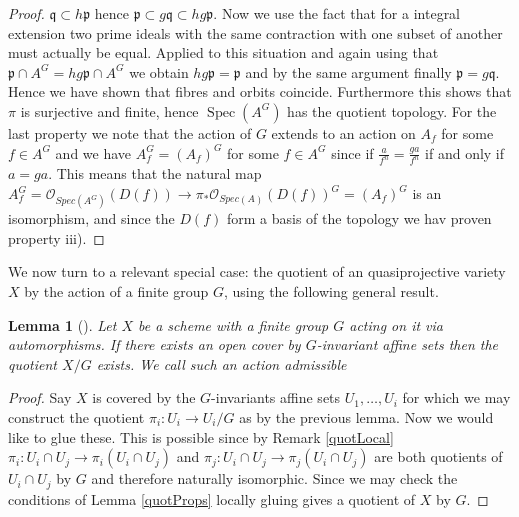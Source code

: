 \documentclass[11pt, a4paper, german]{article}
\theoremstyle{plain}
\newtheorem{lemma}[theorem]{Lemma}
\theoremstyle{definition}
\DeclareMathOperator{\Spec}{Spec}
\begin{document}
\begin{proof}
    $\mathfrak{q} \subset h\mathfrak{p}$ hence $\mathfrak{p} \subset g\mathfrak{q} \subset hg\mathfrak{p}$. Now we use the fact that
    for a integral extension two prime ideals with the same contraction with one subset of another must actually be equal. Applied to this
    situation and again using that $\mathfrak{p} \cap A^G = hg\mathfrak{p} \cap A^G$ we obtain $hg\mathfrak{p} = \mathfrak{p}$ and by the same
    argument finally $\mathfrak{p} = g\mathfrak{q}$. Hence we have shown that fibres and orbits coincide. Furthermore this shows that $\pi$ is
    surjective and finite, hence $\Spec(A^G)$ has the quotient topology.
    For the last property we note that the action of $G$ extends to an action on $A_f$ for some $f \in A^G$ and we have 
    $A^G_f = (A_f)^G$ for some $f \in A^G$ since if $\frac{a}{f^n} = \frac{ga}{f^n}$ if and only if $a = ga$. This means that the natural
    map $A^G_f = \mathcal{O}_{Spec(A^G)}(D(f)) \to \pi_*\mathcal{O}_{Spec(A)}(D(f))^G = (A_f)^G$ is an isomorphism, and since the $D(f)$ form
    a basis of the topology we hav proven property iii).
\end{proof}

We now turn to a relevant special case: the quotient of an quasiprojective variety $X$ by the action of a finite group $G$, using the following
general result.

\begin{lemma}[{\cite[Prop. 1.8]{SGA1}}]    
    Let $X$ be a scheme with a finite group $G$ acting on it via automorphisms. If there exists an open cover by $G$-invariant affine sets
    then the quotient $X/G$ exists.
    We call such an action \emph{admissible}
\end{lemma}
\begin{proof}
    Say $X$ is covered by the $G$-invariants affine sets $U_1,\dots,U_i$ for which we may construct the quotient $\pi_i \colon U_i \to U_i/G$ 
    as by the previous lemma. Now we would like to glue these. This is possible since by Remark \ref{quotLocal} 
$\pi_i \colon U_i \cap U_j \to \pi_i(U_i \cap U_j)$ and $\pi_j \colon U_i \cap U_j \to \pi_j(U_i \cap U_j)$ are both quotients of $U_i \cap U_j$
    by $G$ and therefore naturally isomorphic. Since we may check the conditions of Lemma \ref{quotProps} locally gluing gives a quotient of 
    $X$ by $G$.
\end{proof}
\end{document}
